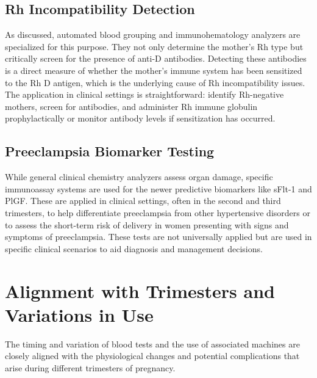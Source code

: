 \documentclass{article}
\begin{document}
\subsection{Rh Incompatibility Detection}
As discussed, automated blood grouping and immunohematology analyzers are specialized for this purpose. They not only determine the mother's Rh type but critically screen for the presence of anti-D antibodies. Detecting these antibodies is a direct measure of whether the mother's immune system has been sensitized to the Rh D antigen, which is the underlying cause of Rh incompatibility issues. The application in clinical settings is straightforward: identify Rh-negative mothers, screen for antibodies, and administer Rh immune globulin prophylactically or monitor antibody levels if sensitization has occurred.

\subsection{Preeclampsia Biomarker Testing}
While general clinical chemistry analyzers assess organ damage, specific immunoassay systems are used for the newer predictive biomarkers like sFlt-1 and PlGF. These are applied in clinical settings, often in the second and third trimesters, to help differentiate preeclampsia from other hypertensive disorders or to assess the short-term risk of delivery in women presenting with signs and symptoms of preeclampsia. These tests are not universally applied but are used in specific clinical scenarios to aid diagnosis and management decisions.

\section{Alignment with Trimesters and Variations in Use}

The timing and variation of blood tests and the use of associated machines are closely aligned with the physiological changes and potential complications that arise during different trimesters of pregnancy.
\end{document}
